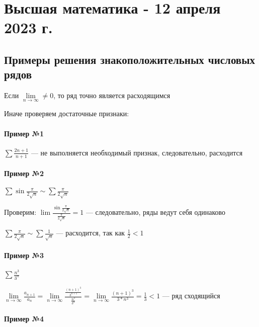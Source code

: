 \documentclass{article}
\begin{document}
\pagebreak
\section{Высшая математика - 12 апреля 2023 г.}

\subsection{Примеры решения знакоположительных числовых рядов}

Если $\lim\limits_{n \to \infty} \ne 0$, то ряд точно является расходящимся

Иначе проверяем достаточные признаки: 
\begin{multienumerate}
\end{multienumerate}

\paragraph{Пример №1}

$\sum \frac{2 n + 1}{n + 1}$ — не выполняется необходимый признак, следовательно, расходится

\paragraph{Пример №2}

$\sum \sin \frac{\pi}{2\sqrt{n}} \sim \sum \frac{\pi}{2\sqrt{n}}$

Проверим: $\lim \frac{\sin \frac{\pi}{2 \sqrt{n}}}{\frac{\pi}{2 \sqrt{n}}} = 1$ — следовательно, ряды ведут себя одинаково

$\sum \frac{\pi}{2\sqrt{n}} \sim \sum \frac{1}{\sqrt{n}}$ — расходится, так как $\frac{1}{2} < 1$

\paragraph{Пример №3}

$\sum \frac{n^3}{3^n}$

$\lim\limits_{n \to \infty} \frac{a_{n + 1}}{a_{n}} = \lim\limits_{n \to \infty} \frac{\frac{(n + 1)^3}{3^{n + 1}}}{\frac{n^3}{3^n}} = \lim\limits_{n \to \infty} \frac{(n + 1)^3}{3 * n^3} = \frac{1}{3} < 1$ — ряд сходящийся

\paragraph{Пример №4}
\end{document}
